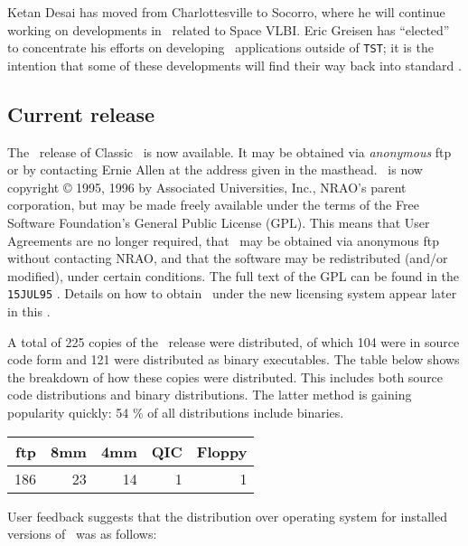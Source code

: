 Ketan Desai has moved from Charlottesville to Socorro, where he will
continue working on developments in \AIPS\ related to Space
\hbox{VLBI}. Eric Greisen has ``elected'' to concentrate his efforts on
developing \AIPS\ applications outside of {\tt TST}; it is the intention
that some of these developments will find their way back into standard
\AIPS.

\subsection{Current release}

The \RELEASENAME\ release of Classic \AIPS\ is now available.  It may
be obtained via {\it anonymous} ftp or by contacting Ernie Allen at
the address given in the masthead.  \AIPS\ is now copyright \copyright
1995, 1996 by Associated Universities, Inc., NRAO's parent
corporation, but may be made freely available under the terms of the
Free Software Foundation's General Public License \hbox{(GPL)}.  This
means that User Agreements are no longer required, that \AIPS\ may be
obtained via anonymous ftp without contacting NRAO, and that the
software may be redistributed (and/or modified), under certain
conditions.  The full text of the GPL can be found in the {\tt
15JUL95} \Aipsletter. Details on how to obtain \AIPS\ under the new
licensing system appear later in this \Aipsletter.

A total of 225 copies of the \OLDNAME\ release were distributed, of
which 104 were in source code form and 121 were distributed as binary
executables.  The table below shows the breakdown of how these copies
were distributed. This includes both source code distributions and
binary distributions. The latter method is gaining popularity quickly:
54 \% of all distributions include binaries.

\begin{center}
\begin{tabular}{|r|r|r|r|r|} \hline\hline
{ftp} & {8mm} & {4mm} & {QIC} & {Floppy} \\ \hline
186   &   23  &   14  &    1  &       1  \\ \hline\hline
\end{tabular}
\end{center}

\eject
User feedback suggests that the distribution over operating system for
installed versions of \OLDNAME\ was as follows:

